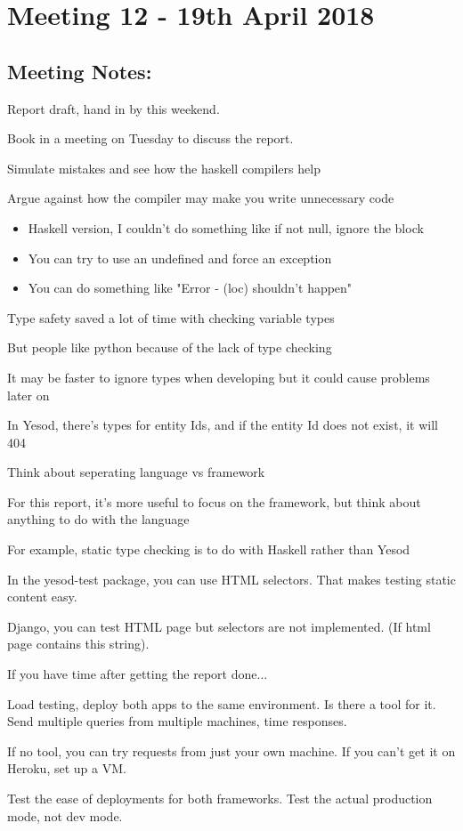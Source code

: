 \section{Meeting 12 - 19th April 2018}

\subsection{Meeting Notes:}
Report draft, hand in by this weekend.

Book in a meeting on Tuesday to discuss the report.

Simulate mistakes and see how the haskell compilers help

Argue against how the compiler may make you write unnecessary code

\begin{itemize}
  \item{Haskell version, I couldn't do something like if not null, ignore the block}
  \item{You can try to use an undefined and force an exception}
  \item{You can do something like "Error - (loc) shouldn't happen"}
\end{itemize}

Type safety saved a lot of time with checking variable types

But people like python because of the lack of type checking

It may be faster to ignore types when developing but it could cause problems later on

In Yesod, there's types for entity Ids, and if the entity Id does not exist, it will 404

Think about seperating language vs framework

For this report, it's more useful to focus on the framework, but think about anything to do with the language

For example, static type checking is to do with Haskell rather than Yesod

In the yesod-test package, you can use HTML selectors. That makes testing static content easy.

Django, you can test HTML page but selectors are not implemented. (If html page contains this string).

If you have time after getting the report done...

Load testing, deploy both apps to the same environment. Is there a tool for it. Send 
multiple queries from multiple machines, time responses.

If no tool, you can try requests from just your own machine.
If you can't get it on Heroku, set up a VM.

Test the ease of deployments for both frameworks. Test the actual production mode, not dev mode.

